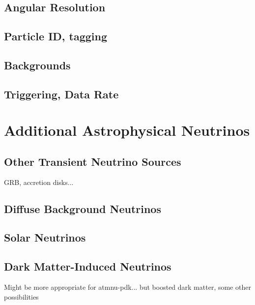 \subsection{Angular Resolution}
\subsection{Particle ID, tagging}
\subsection{Backgrounds}
\subsection{Triggering, Data Rate}


\section{Additional Astrophysical Neutrinos}
\label{sec:physics-snblowe-other}

\subsection{Other Transient Neutrino Sources}

GRB, accretion disks...

\subsection{Diffuse Background Neutrinos}

\subsection{Solar Neutrinos}

\subsection{Dark Matter-Induced Neutrinos}

Might be more appropriate for atmnu-pdk... but boosted dark matter,
some other possibilities

